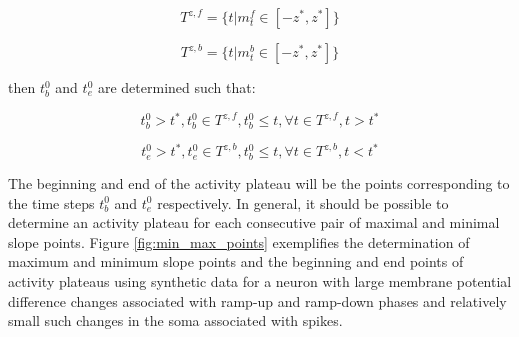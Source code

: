 \begin{equation}
\label{eq:plateau_begin}
T^{z,f} = \{t|m_{t}^{f} \in [-z^{*},z^{*}]\}
\end{equation}

\begin{equation}
\label{eq:plateau_end}
T^{z,b} = \{t|m_{t}^{b} \in [-z^{*},z^{*}]\}
\end{equation}

then $t_{b}^{0}$ and $t_{e}^{0}$ are determined such that:

\begin{equation}
\label{eq:plateau_time_begin}
t_{b}^{0} > t^{*}, t_{b}^{0} \in T^{z,f},t_{b}^{0} \leq t, \forall t \in T^{z,f},t>t^{*}
\end{equation}

\begin{equation}
\label{eq:plateau_time_end}
t_{e}^{0} > t^{*}, t_{e}^{0} \in T^{z,b},t_{b}^{0} \leq t, \forall t \in T^{z,b},t<t^{*}
\end{equation}

The beginning and end of the activity plateau will be the points corresponding to the time steps $t_{b}^{0}$ and $t_{e}^{0}$ respectively. In general, it should be possible to determine an activity plateau for each consecutive  pair of maximal and  minimal slope points. Figure \ref{fig:min_max_points} exemplifies the determination of maximum and minimum slope points and the beginning and end points of activity plateaus using synthetic data for a neuron with large membrane potential difference changes associated with ramp-up and ramp-down phases and relatively small such changes in the soma associated with spikes.

